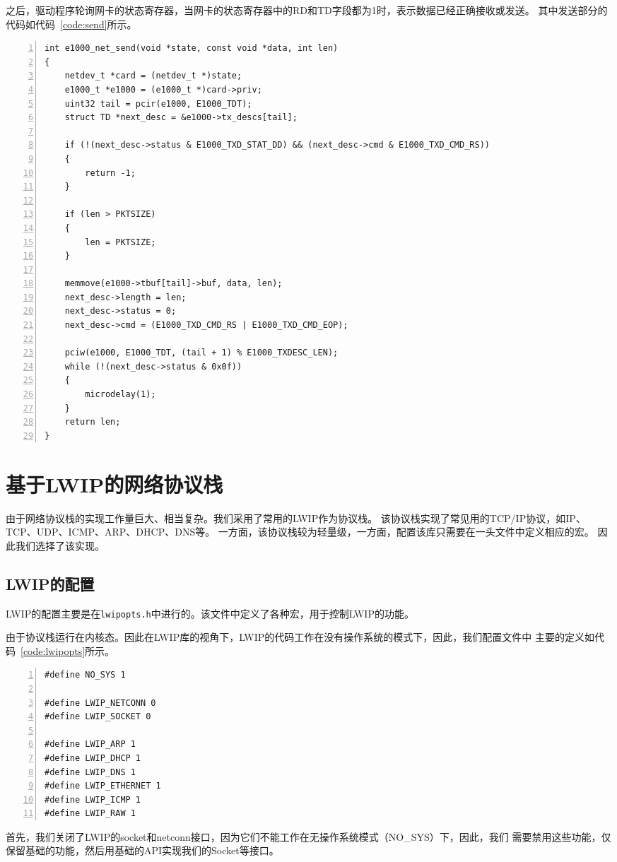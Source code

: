 \documentclass[a4paper,twoside]{ctexrep}
\begin{document}
\begin{spacing}{1.2}
之后，驱动程序轮询网卡的状态寄存器，当网卡的状态寄存器中的RD和TD字段都为1时，表示数据已经正确接收或发送。
其中发送部分的代码如代码~\ref{code:send}所示。
\begin{lstlisting}[numbers=left,style=CppStyle,caption=数据发送,label={code:send}]
int e1000_net_send(void *state, const void *data, int len)
{
	netdev_t *card = (netdev_t *)state;
	e1000_t *e1000 = (e1000_t *)card->priv;
	uint32 tail = pcir(e1000, E1000_TDT);
	struct TD *next_desc = &e1000->tx_descs[tail];

	if (!(next_desc->status & E1000_TXD_STAT_DD) && (next_desc->cmd & E1000_TXD_CMD_RS))
	{
		return -1;
	}

	if (len > PKTSIZE)
	{
		len = PKTSIZE;
	}

	memmove(e1000->tbuf[tail]->buf, data, len);
	next_desc->length = len;
	next_desc->status = 0;
	next_desc->cmd = (E1000_TXD_CMD_RS | E1000_TXD_CMD_EOP);

	pciw(e1000, E1000_TDT, (tail + 1) % E1000_TXDESC_LEN);
	while (!(next_desc->status & 0x0f))
	{
		microdelay(1);
	}
	return len;
}
\end{lstlisting}


\section{基于LWIP的网络协议栈}

由于网络协议栈的实现工作量巨大、相当复杂。我们采用了常用的LWIP作为协议栈。
该协议栈实现了常见用的TCP/IP协议，如IP、TCP\cite{postel1981transmission}、UDP\cite{postel1980user}、ICMP、ARP、DHCP、DNS等。
一方面，该协议栈较为轻量级，一方面，配置该库只需要在一头文件中定义相应的宏。
因此我们选择了该实现。

\subsection{LWIP的配置}

LWIP的配置主要是在\texttt{lwipopts.h}中进行的。该文件中定义了各种宏，用于控制LWIP的功能。

由于协议栈运行在内核态。因此在LWIP库的视角下，LWIP的代码工作在没有操作系统的模式下，因此，我们配置文件中
主要的定义如代码~\ref{code:lwipopts}所示。
\begin{lstlisting}[numbers=left,style=CppStyle,caption=LWIP配置,label={code:lwipopts}]
#define NO_SYS 1

#define LWIP_NETCONN 0
#define LWIP_SOCKET 0

#define LWIP_ARP 1
#define LWIP_DHCP 1
#define LWIP_DNS 1
#define LWIP_ETHERNET 1
#define LWIP_ICMP 1
#define LWIP_RAW 1
\end{lstlisting}
首先，我们关闭了LWIP的socket和netconn接口，因为它们不能工作在无操作系统模式（NO\_SYS）下，因此，我们
需要禁用这些功能，仅保留基础的功能，然后用基础的API实现我们的Socket等接口。


\end{spacing}
\end{document}
